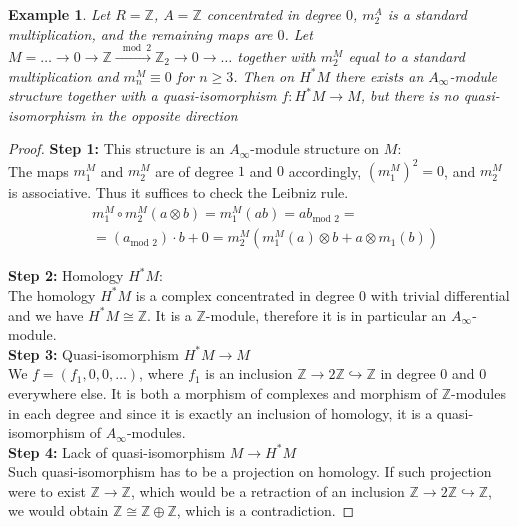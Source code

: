 \documentclass[a4paper, 12pt, openany, fleqn]{amsart}
\newtheorem{exmp}[theorem]{Example}
\begin{document}
\begin{exmp}
Let $R=\mathbb{Z}$, $A = \mathbb{Z}$ concentrated in degree $0$, $m_2^A$ is a standard multiplication, and the remaining maps are $0$. Let $M = \dots\rightarrow 0 \rightarrow \mathbb{Z} \xrightarrow{\mod{2}} \mathbb{Z}_2\rightarrow 0 \rightarrow \dots$ together with $m_2^M$ equal to a standard multiplication and $m_n^M \equiv 0$ for $n\geq 3$. Then on $H^*M$ there exists an $A_\infty$-module structure together with a quasi-isomorphism $f:H^*M\longrightarrow M$, but there is no quasi-isomorphism in the opposite direction
\end{exmp}
\begin{proof}
    \textbf{Step 1:} This structure is an $A_\infty$-module structure on $M$:\\
     The maps $m_1^M$ and $m_2^M$ are of degree $1$ and $0$ accordingly, $(m_1^M)^2=0$, and $m_2^M$ is associative. Thus it suffices to check the Leibniz rule.
     \begin{align*}
         &m_1^M \circ m_2^M(a\otimes b) = m_1^M(ab) = ab_{\text{mod } 2}=\\ &= (a_{\text{mod } 2})\cdot b + 0 =  m_2^M(m_1^M(a)\otimes b + a\otimes m_1(b))
     \end{align*}

     \smallskip
     \textbf{Step 2:} Homology $H^*M$:\\
     The homology $H^*M$ is a complex concentrated in degree $0$ with trivial differential and we have $H^*M\cong\mathbb{Z}$. It is a $\mathbb{Z}$-module, therefore it is in particular an $A_\infty$-module.\\

     \smallskip
     \textbf{Step 3:} Quasi-isomorphism $H^*M \longrightarrow M$\\
     We $f = (f_1,0,0,\dots)$, where $f_1$ is an inclusion $\mathbb{Z}\longrightarrow 2\mathbb{Z} \hookrightarrow \mathbb{Z}$ in degree $0$ and $0$ everywhere else. It is both a morphism of complexes and morphism of $\mathbb{Z}$-modules in each degree and since it is exactly an inclusion of homology, it is a quasi-isomorphism of $A_\infty$-modules.\\

     \smallskip
     \textbf{Step 4:} Lack of quasi-isomorphism $M\longrightarrow H^*M$\\
     Such quasi-isomorphism has to be a projection on homology. If such projection were to exist $\mathbb{Z}\longrightarrow\mathbb{Z}$, which would be a retraction of an inclusion $\mathbb{Z}\longrightarrow 2\mathbb{Z} \hookrightarrow \mathbb{Z}$, we would obtain $\mathbb{Z}\cong \mathbb{Z}\oplus\mathbb{Z}$, which is a contradiction.
\end{proof}
\end{document}
